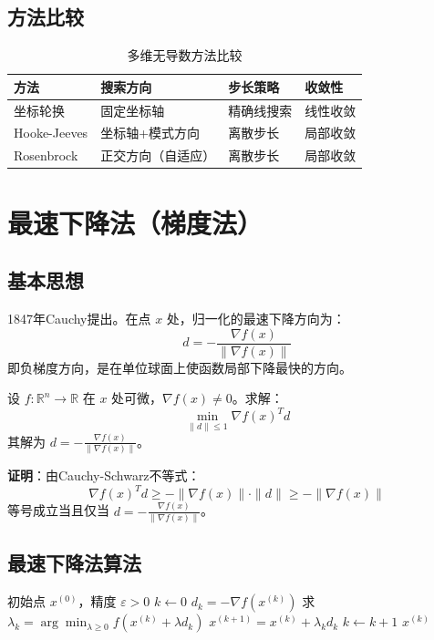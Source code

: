 \subsection{方法比较}

\begin{table}[H]
\centering
\caption{多维无导数方法比较}
\begin{tabular}{@{}llll@{}}
\toprule
\textbf{方法} & \textbf{搜索方向} & \textbf{步长策略} & \textbf{收敛性} \\
\midrule
坐标轮换 & 固定坐标轴 & 精确线搜索 & 线性收敛 \\
Hooke-Jeeves & 坐标轴+模式方向 & 离散步长 & 局部收敛 \\
Rosenbrock & 正交方向（自适应） & 离散步长 & 局部收敛 \\
\bottomrule
\end{tabular}
\end{table}

\section{最速下降法（梯度法）}\label{sec:gradient}

\subsection{基本思想}

\begin{conceptbox}[最速下降方向]
1847年Cauchy提出。在点 $x$ 处，归一化的最速下降方向为：
\[
d = -\frac{\nabla f(x)}{\|\nabla f(x)\|}
\]
即负梯度方向，是在单位球面上使函数局部下降最快的方向。
\end{conceptbox}

\begin{lemma}[最速下降方向的验证]
设 $f: \mathbb{R}^n \to \mathbb{R}$ 在 $x$ 处可微，$\nabla f(x) \neq 0$。求解：
\[
\min_{\|d\| \leq 1} \nabla f(x)^T d
\]
其解为 $d = -\frac{\nabla f(x)}{\|\nabla f(x)\|}$。
\end{lemma}

\textbf{证明}：由Cauchy-Schwarz不等式：
\[
\nabla f(x)^T d \geq -\|\nabla f(x)\| \cdot \|d\| \geq -\|\nabla f(x)\|
\]
等号成立当且仅当 $d = -\frac{\nabla f(x)}{\|\nabla f(x)\|}$。

\subsection{最速下降法算法}

\begin{algorithm}[H]
\caption{最速下降法}
\begin{algorithmic}[1]
\Require 初始点 $x^{(0)}$，精度 $\varepsilon > 0$
\State $k \gets 0$
    \State $d_k = -\nabla f(x^{(k)})$
    \State 求 $\lambda_k = \arg\min_{\lambda \geq 0} f(x^{(k)} + \lambda d_k)$
    \State $x^{(k+1)} = x^{(k)} + \lambda_k d_k$
    \State $k \gets k + 1$
\EndWhile
\State \Return $x^{(k)}$
\end{algorithmic}
\end{algorithm}

